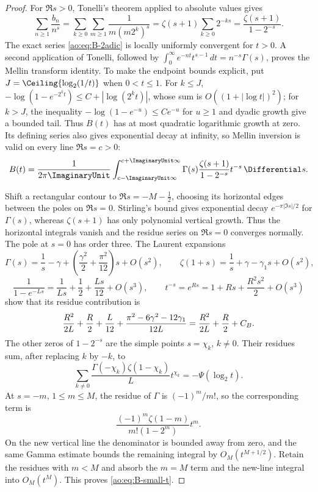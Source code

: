 \begin{proof}
For $\Re s>0$, Tonelli's theorem applied to absolute values gives
\[
 \sum_{n\ge1}\frac{b_n}{n^s}
 =\sum_{k\ge0}\sum_{m\ge1}\frac{1}{m(m2^k)^s}
 =\zeta(s+1)\sum_{k\ge0}2^{-ks}
 =\frac{\zeta(s+1)}{1-2^{-s}}.
\]
The exact series \eqref{ao:eq:B-2adic} is locally uniformly convergent for
$t>0$.  A second application of Tonelli, followed by
$\int_0^\infty e^{-nt}t^{s-1}\,dt=n^{-s}\Gamma(s)$, proves the Mellin
transform identity.  To make the endpoint bounds explicit, put
$J=\Ceiling{\log_2(1/t)}$ when $0<t\le1$.  For $k\le J$,
$-\log(1-e^{-2^kt})\le C+|\log(2^kt)|$, whose sum is
$O((1+|\log t|)^2)$; for $k>J$, the inequality
$-\log(1-e^{-u})\le C e^{-u}$ for $u\ge1$ and dyadic growth give a bounded
tail.  Thus $B(t)$ has at most quadratic logarithmic growth at zero.  Its
defining series also gives exponential decay at infinity, so Mellin inversion
is valid on every line $\Re s=c>0$:
\[
 B(t)=\frac{1}{2\pi\ImaginaryUnit}
 \int_{c-\ImaginaryUnit\infty}^{c+\ImaginaryUnit\infty}
 \Gamma(s)\frac{\zeta(s+1)}{1-2^{-s}}t^{-s}\,\Differential s.
\]

Shift a rectangular contour to $\Re s=-M-\tfrac12$, choosing its horizontal
edges between the poles on $\Re s=0$.  Stirling's bound gives exponential
decay $e^{-\pi|\Im s|/2}$ for $\Gamma(s)$, whereas $\zeta(s+1)$ has only
polynomial vertical growth.  Thus the horizontal integrals vanish and the
residue series on $\Re s=0$ converges normally.  The pole at $s=0$ has order
three.  The Laurent expansions
\[
 \Gamma(s)=\frac1s-\gamma+
 \left(\frac{\gamma^2}{2}+\frac{\pi^2}{12}\right)s+O(s^2),\qquad
 \zeta(1+s)=\frac1s+\gamma-\gamma_1s+O(s^2),
\]
\[
 \frac1{1-e^{-Ls}}=\frac1{Ls}+\frac12+\frac{Ls}{12}+O(s^3),
 \qquad t^{-s}=e^{Rs}=1+Rs+\frac{R^2s^2}{2}+O(s^3)
\]
show that its residue contribution is
\[
 \frac{R^2}{2L}+\frac R2+\frac L{12}
 +\frac{\pi^2-6\gamma^2-12\gamma_1}{12L}
 =\frac{R^2}{2L}+\frac R2+C_B.
\]
The other zeros of $1-2^{-s}$ are the simple points $s=\chi_k$, $k\ne0$.
Their residues sum, after replacing $k$ by $-k$, to
\[
 \sum_{k\ne0}\frac{\Gamma(-\chi_k)\zeta(1-\chi_k)}{L}t^{\chi_k}
 =-\Psi(\log_2t).
\]
At $s=-m$, $1\le m\le M$, the residue of $\Gamma$ is $(-1)^m/m!$,
so the corresponding term is
\[
 \frac{(-1)^m\zeta(1-m)}{m!(1-2^m)}t^m.
\]
On the new vertical line the denominator is bounded away from zero, and the
same Gamma estimate bounds the remaining integral by $O_M(t^{M+1/2})$.
Retain the residues with $m<M$ and absorb the $m=M$ term and the new-line
integral into $O_M(t^M)$.  This proves \eqref{ao:eq:B-small-t}.
\end{proof}

